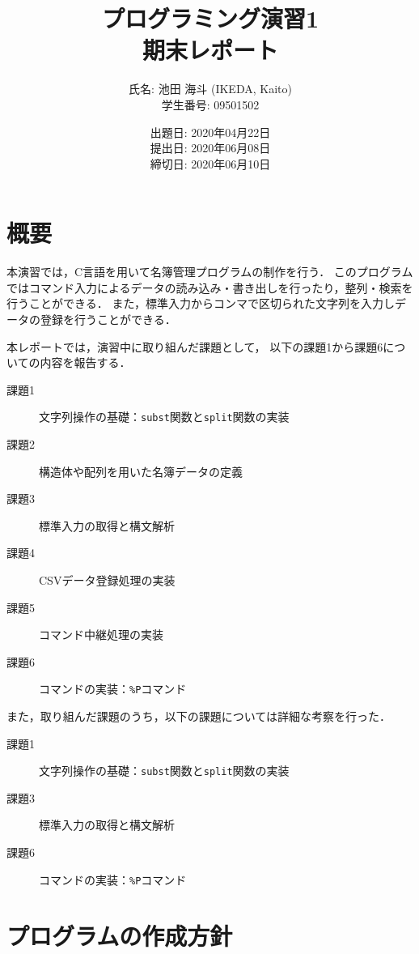 \documentclass[autodetect-engine,dvi=dvipdfmx,ja=standard,
               a4j,11pt]{bxjsarticle}
\title{プログラミング演習1 \\
       期末レポート}
\author{氏名: 池田 海斗 (IKEDA, Kaito) \\
        学生番号: 09501502}
\date{出題日: 2020年04月22日 \\
      提出日: 2020年06月08日 \\
      締切日: 2020年06月10日 \\}
\begin{document}
\maketitle

\section{概要} \label{sec:1}

本演習では，C言語を用いて名簿管理プログラムの制作を行う．
このプログラムではコマンド入力によるデータの読み込み・書き出しを行ったり，整列・検索を行うことができる．
また，標準入力からコンマで区切られた文字列を入力しデータの登録を行うことができる．

本レポートでは，演習中に取り組んだ課題として，
以下の課題1から課題6についての内容を報告する．

\begin{description}
  \item[課題1] 文字列操作の基礎：\verb|subst|関数と\verb|split|関数の実装
  \item[課題2] 構造体や配列を用いた名簿データの定義
  \item[課題3] 標準入力の取得と構文解析
  \item[課題4] CSVデータ登録処理の実装
  \item[課題5] コマンド中継処理の実装
  \item[課題6] コマンドの実装：\verb|%P|コマンド
\end{description}

また，取り組んだ課題のうち，以下の課題については詳細な考察を行った．

\begin{description}
  \item[課題1] 文字列操作の基礎：\verb|subst|関数と\verb|split|関数の実装
  \item[課題3] 標準入力の取得と構文解析
  \item[課題6] コマンドの実装：\verb|%P|コマンド
\end{description}


\section{プログラムの作成方針} \label{sec:2}
\end{document}
